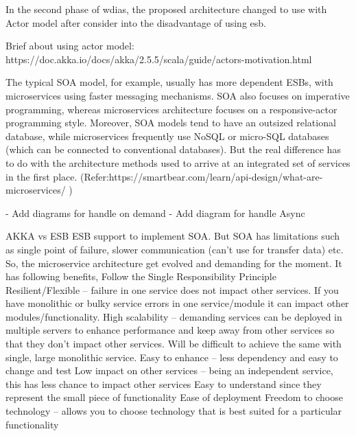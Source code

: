 In the second phase of \acrshort{wdias}, the proposed architecture changed to use with Actor model after consider into the disadvantage of using \acrshort{esb}.

Brief about using actor model:
https://doc.akka.io/docs/akka/2.5.5/scala/guide/actors-motivation.html

The typical SOA model, for example, usually has more dependent ESBs, with microservices using faster messaging mechanisms.  SOA also focuses on imperative programming, whereas microservices architecture focuses on a responsive-actor programming style.  Moreover, SOA models tend to have an outsized relational database, while microservices frequently use NoSQL or micro-SQL databases (which can be connected to conventional databases).  But the real difference has to do with the architecture methods used to arrive at an integrated set of services in the first place. (Refer:https://smartbear.com/learn/api-design/what-are-microservices/ )

- Add diagrams for handle on demand
- Add diagram for handle Async


AKKA vs ESB
ESB support to implement SOA. But SOA has limitations such as single point of failure, slower communication (can’t use for transfer data) etc. So, the microservice architecture get evolved and demanding for the moment. It has following benefits,
Follow the Single Responsibility Principle
Resilient/Flexible – failure in one service does not impact other services. If you have monolithic or bulky service errors in one service/module it can impact other modules/functionality.
High scalability – demanding services can be deployed in multiple servers to enhance performance and keep away from other services so that they don’t impact other services. Will be difficult to achieve the same with single, large monolithic service.
Easy to enhance – less dependency and easy to change and test
Low impact on other services – being an independent service, this has less chance to impact other services
Easy to understand since they represent the small piece of functionality
Ease of deployment
Freedom to choose technology – allows you to choose technology that is best suited for a particular functionality
